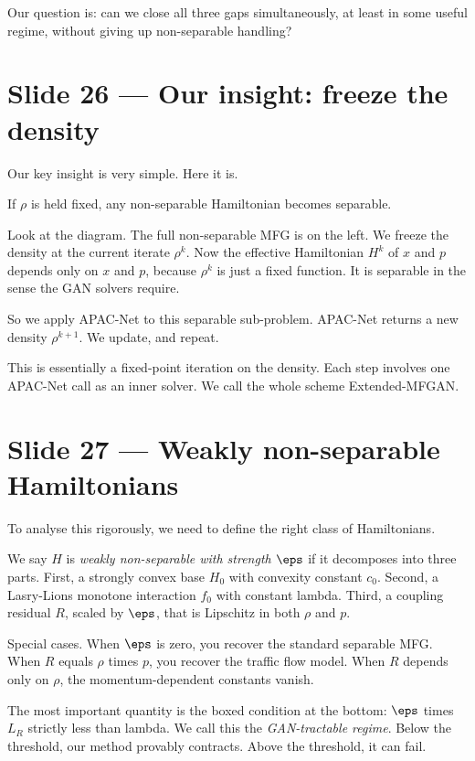 \documentclass[11pt]{article}
\begin{document}
Our question is: can we close all three gaps simultaneously, at least
in some useful regime, without giving up non-separable handling?

\section*{Slide 26 --- Our insight: freeze the density}

Our key insight is very simple.  Here it is.

If $\rho$ is held fixed, any non-separable Hamiltonian becomes
separable.

Look at the diagram.  The full non-separable MFG is on the left.  We
freeze the density at the current iterate $\rho^k$.  Now the effective
Hamiltonian $H^k$ of $x$ and $p$ depends only on $x$ and $p$, because
$\rho^k$ is just a fixed function.  It is separable in the sense the
GAN solvers require.

So we apply APAC-Net to this separable sub-problem.  APAC-Net returns a
new density $\rho^{k+1}$.  We update, and repeat.

This is essentially a fixed-point iteration on the density.  Each step
involves one APAC-Net call as an inner solver.  We call the whole
scheme Extended-MFGAN.

\section*{Slide 27 --- Weakly non-separable Hamiltonians}

To analyse this rigorously, we need to define the right class of
Hamiltonians.

We say $H$ is \emph{weakly non-separable with strength $\eps$} if it
decomposes into three parts.  First, a strongly convex base $H_0$ with
convexity constant $c_0$.  Second, a Lasry-Lions monotone interaction
$f_0$ with constant lambda.  Third, a coupling residual $R$, scaled by
$\eps$, that is Lipschitz in both $\rho$ and $p$.

Special cases.  When $\eps$ is zero, you recover the standard separable
MFG.  When $R$ equals $\rho$ times $p$, you recover the traffic flow
model.  When $R$ depends only on $\rho$, the momentum-dependent constants
vanish.

The most important quantity is the boxed condition at the bottom:
$\eps$ times $L_R$ strictly less than lambda.  We call this the
\emph{GAN-tractable regime}.  Below the threshold, our method
provably contracts.  Above the threshold, it can fail.
\end{document}
